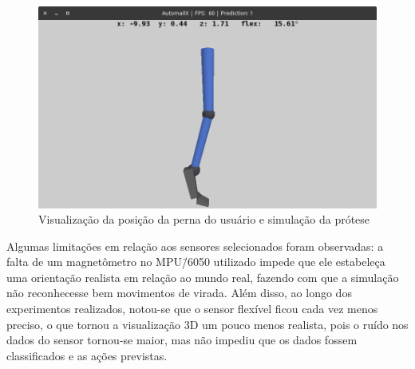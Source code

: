 \begin{figure}[ht]
	\caption{\label{fig:result_simulacao}Visualização da posição da perna do usuário e simulação da prótese}
	\begin{center}
	    \includegraphics[width=.8\textwidth]{resources/result_simulacao}
	\end{center}
\end{figure}

Algumas limitações em relação aos sensores selecionados foram observadas: a falta de um magnetômetro no MPU\=/6050 utilizado impede que ele estabeleça uma orientação realista em relação ao mundo real, fazendo com que a simulação não reconhecesse bem movimentos de virada. Além disso, ao longo dos experimentos realizados, notou-se que o sensor flexível ficou cada vez menos preciso, o que tornou a visualização 3D um pouco menos realista, pois o ruído nos dados do sensor tornou-se maior, mas não impediu que os dados fossem classificados e as ações previstas.